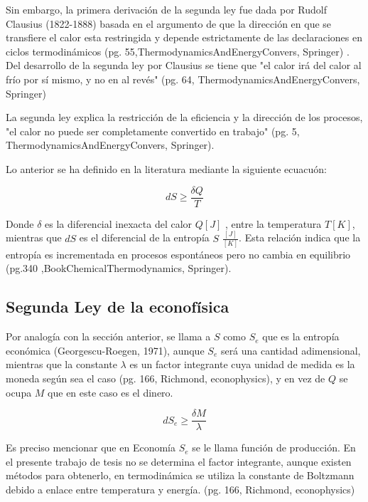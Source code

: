 Sin embargo, la primera derivación de la segunda ley fue dada por Rudolf Clausius (1822-1888) basada en el argumento de que la dirección en que se transfiere el calor esta restringida y depende estrictamente de las declaraciones en ciclos termodinámicos (pg. 55,ThermodynamicsAndEnergyConvers, Springer) . Del desarrollo de la segunda ley por Clausius se tiene que "el calor irá del calor al frío por sí mismo, y no en al revés" (pg. 64, ThermodynamicsAndEnergyConvers, Springer)

La segunda ley explica la restricción de la eficiencia y la dirección de los procesos, "el calor no puede ser completamente convertido en trabajo" (pg. 5, ThermodynamicsAndEnergyConvers, Springer). 

Lo anterior se ha definido en la literatura mediante la siguiente ecuacuón:

\begin{equation}
dS \geqslant \frac{\delta Q}{T}
\end{equation}

Donde $\delta$ es la diferencial inexacta del calor $Q [J]$ , entre la temperatura $T [K]$, mientras que $dS$ es el diferencial de la entropía $S$ $\frac{[J]}{[K]}$. Esta relación indica que la entropía es incrementada en procesos espontáneos pero no cambia en equilibrio (pg.340 ,BookChemicalThermodynamics, Springer).

\subsection{Segunda Ley de la econofísica} 

Por analogía con la sección anterior, se llama a $S$ como $S_e$ que es la entropía económica (Georgescu-Roegen, 1971), aunque $S_e$ será una cantidad adimensional, mientras que la constante $\lambda$ es un factor integrante cuya unidad de medida es la moneda según sea el caso (pg. 166, Richmond, econophysics), y en vez de $Q$ se ocupa $M$ que en este caso es el dinero. 

\begin{equation}
dS_e \geqslant \frac{\delta M}{\lambda}
\end{equation}

Es preciso mencionar que en Economía $S_e$ se le llama función de producción. En el presente trabajo de tesis no se determina el factor integrante, aunque existen métodos para obtenerlo, en termodinámica se utiliza la constante de Boltzmann debido a enlace entre temperatura y energía. (pg. 166, Richmond, econophysics)

